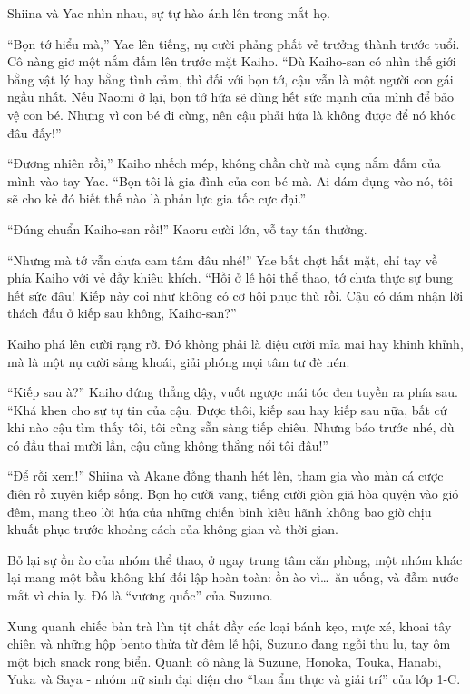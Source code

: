 \documentclass[../main.tex]{subfiles}
\begin{document}
Shiina và Yae nhìn nhau, sự tự hào ánh lên trong mắt họ.

``Bọn tớ hiểu mà,'' Yae lên tiếng, nụ cười phảng phất vẻ trưởng thành trước tuổi. Cô nàng giơ một nắm đấm lên trước mặt Kaiho. ``Dù Kaiho-san có nhìn thế giới bằng vật lý hay bằng tình cảm, thì đối với bọn tớ, cậu vẫn là một người con gái ngầu nhất. Nếu Naomi ở lại, bọn tớ hứa sẽ dùng hết sức mạnh của mình để bảo vệ con bé. Nhưng vì con bé đi cùng, nên cậu phải hứa là không được để nó khóc đâu đấy!''

``Đương nhiên rồi,'' Kaiho nhếch mép, không chần chừ mà cụng nắm đấm của mình vào tay Yae. ``Bọn tôi là gia đình của con bé mà. Ai dám đụng vào nó, tôi sẽ cho kẻ đó biết thế nào là phản lực gia tốc cực đại.''

``Đúng chuẩn Kaiho-san rồi!'' Kaoru cười lớn, vỗ tay tán thưởng.

``Nhưng mà tớ vẫn chưa cam tâm đâu nhé!'' Yae bất chợt hất mặt, chỉ tay về phía Kaiho với vẻ đầy khiêu khích. ``Hồi ở lễ hội thể thao, tớ chưa thực sự bung hết sức đâu! Kiếp này coi như không có cơ hội phục thù rồi. Cậu có dám nhận lời thách đấu ở kiếp sau không, Kaiho-san?''

Kaiho phá lên cười rạng rỡ. Đó không phải là điệu cười mỉa mai hay khinh khỉnh, mà là một nụ cười sảng khoái, giải phóng mọi tâm tư đè nén.

``Kiếp sau à?'' Kaiho đứng thẳng dậy, vuốt ngược mái tóc đen tuyền ra phía sau. ``Khá khen cho sự tự tin của cậu. Được thôi, kiếp sau hay kiếp sau nữa, bất cứ khi nào cậu tìm thấy tôi, tôi cũng sẵn sàng tiếp chiêu. Nhưng báo trước nhé, dù có đầu thai mười lần, cậu cũng không thắng nổi tôi đâu!''

``Để rồi xem!'' Shiina và Akane đồng thanh hét lên, tham gia vào màn cá cược điên rồ xuyên kiếp sống. Bọn họ cười vang, tiếng cười giòn giã hòa quyện vào gió đêm, mang theo lời hứa của những chiến binh kiêu hãnh không bao giờ chịu khuất phục trước khoảng cách của không gian và thời gian.

\ct

Bỏ lại sự ồn ào của nhóm thể thao, ở ngay trung tâm căn phòng, một nhóm khác lại mang một bầu không khí đối lập hoàn toàn: ồn ào vì\dots\ ăn uống, và đẫm nước mắt vì chia ly. Đó là ``vương quốc'' của Suzuno.

Xung quanh chiếc bàn trà lùn tịt chất đầy các loại bánh kẹo, mực xé, khoai tây chiên và những hộp bento thừa từ đêm lễ hội, Suzuno đang ngồi thu lu, tay ôm một bịch snack rong biển. Quanh cô nàng là Suzune, Honoka, Touka, Hanabi, Yuka và Saya - nhóm nữ sinh đại diện cho ``ban ẩm thực và giải trí'' của lớp 1-C.
\end{document}
